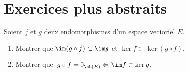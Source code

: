 \documentclass[a4paper, 11pt,reqno]{article}
\begin{document}
\vspace{1cm}

\noindent\section{\large{Exercices plus abstraits}}
\begin{exercice}  \;
	Soient $f$ et $g$ deux endomorphismes d'un espace vectoriel $E$.
	\begin{enumerate}
		\item Montrer que $\im (g\circ f)\subset \im g$ et $\ker f\subset \ker (g\circ f)$.
		\item Montrer que: $g\circ f=0_{\cL (E)}\Leftrightarrow \im f \subset \ker g$.
	\end{enumerate}
\end{exercice}
\end{document}
